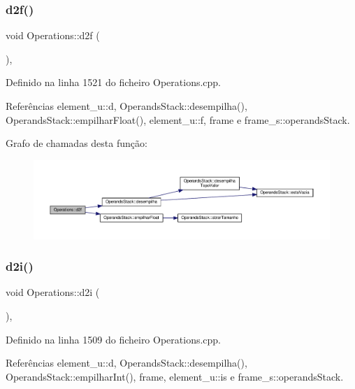 \subsubsection{\texorpdfstring{d2f()}{d2f()}}
{\footnotesize\ttfamily void Operations\+::d2f (\begin{DoxyParamCaption}{ }\end{DoxyParamCaption})\hspace{0.3cm}{\ttfamily [static]}, {\ttfamily [private]}}



Definido na linha 1521 do ficheiro Operations.\+cpp.



Referências element\+\_\+u\+::d, Operands\+Stack\+::desempilha(), Operands\+Stack\+::empilhar\+Float(), element\+\_\+u\+::f, frame e frame\+\_\+s\+::operands\+Stack.

Grafo de chamadas desta função\+:\nopagebreak
\begin{figure}[H]
\begin{center}
\leavevmode
\includegraphics[width=350pt]{classOperations_ab5a2d770d297ace1ec0e40d3fed9f0e3_cgraph}
\end{center}
\end{figure}
\mbox{\label{classOperations_aa8cda1c04343e047078b72b51c575e1c}} 
\subsubsection{\texorpdfstring{d2i()}{d2i()}}
{\footnotesize\ttfamily void Operations\+::d2i (\begin{DoxyParamCaption}{ }\end{DoxyParamCaption})\hspace{0.3cm}{\ttfamily [static]}, {\ttfamily [private]}}



Definido na linha 1509 do ficheiro Operations.\+cpp.



Referências element\+\_\+u\+::d, Operands\+Stack\+::desempilha(), Operands\+Stack\+::empilhar\+Int(), frame, element\+\_\+u\+::is e frame\+\_\+s\+::operands\+Stack.

